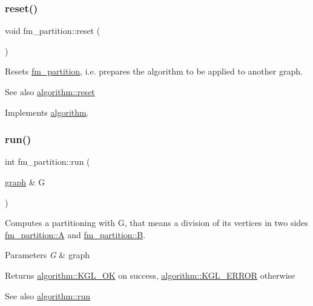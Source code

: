 \subsubsection{\texorpdfstring{reset()}{reset()}}
{\footnotesize\ttfamily void fm\+\_\+partition\+::reset (\begin{DoxyParamCaption}{ }\end{DoxyParamCaption})\hspace{0.3cm}{\ttfamily [virtual]}}

Resets \mbox{\hyperlink{classfm__partition}{fm\+\_\+partition}}, i.\+e. prepares the algorithm to be applied to another graph.

\begin{DoxySeeAlso}{See also}
\mbox{\hyperlink{classalgorithm_a21aba63d066ae7897de6ca7d8425c408}{algorithm\+::reset}} 
\end{DoxySeeAlso}


Implements \mbox{\hyperlink{classalgorithm_a21aba63d066ae7897de6ca7d8425c408}{algorithm}}.

\mbox{\label{classfm__partition_a015b171fcaa01973ebe6c6a46a727097}} 
\subsubsection{\texorpdfstring{run()}{run()}}
{\footnotesize\ttfamily int fm\+\_\+partition\+::run (\begin{DoxyParamCaption}\item[{\mbox{\hyperlink{classgraph}{graph}} \&}]{G }\end{DoxyParamCaption})\hspace{0.3cm}{\ttfamily [virtual]}}

Computes a partitioning with {\ttfamily G}, that means a division of its vertices in two sides {\ttfamily \mbox{\hyperlink{classfm__partition_a973d30e9eb0d21f659ef288176cd4791}{fm\+\_\+partition\+::A}} } and {\ttfamily \mbox{\hyperlink{classfm__partition_a42515c44eecb7ba3e2ec549a877ef238}{fm\+\_\+partition\+::B}}}.


\begin{DoxyParams}{Parameters}
{\em G} & graph \\
\hline
\end{DoxyParams}
\begin{DoxyReturn}{Returns}
{\ttfamily \mbox{\hyperlink{classalgorithm_af1a0078e153aa99c24f9bdf0d97f6710aae4c1cd7fe8d8cf4b143241a6e7c31cf}{algorithm\+::\+K\+G\+L\+\_\+\+OK}}} on success, {\ttfamily \mbox{\hyperlink{classalgorithm_af1a0078e153aa99c24f9bdf0d97f6710ae67bf27b2ef31f73e545a7f9f4a69556}{algorithm\+::\+K\+G\+L\+\_\+\+E\+R\+R\+OR}}} otherwise 
\end{DoxyReturn}
\begin{DoxySeeAlso}{See also}
\mbox{\hyperlink{classalgorithm_a734b189509a8d6b56b65f8ff772d43ca}{algorithm\+::run}} 
\end{DoxySeeAlso}



